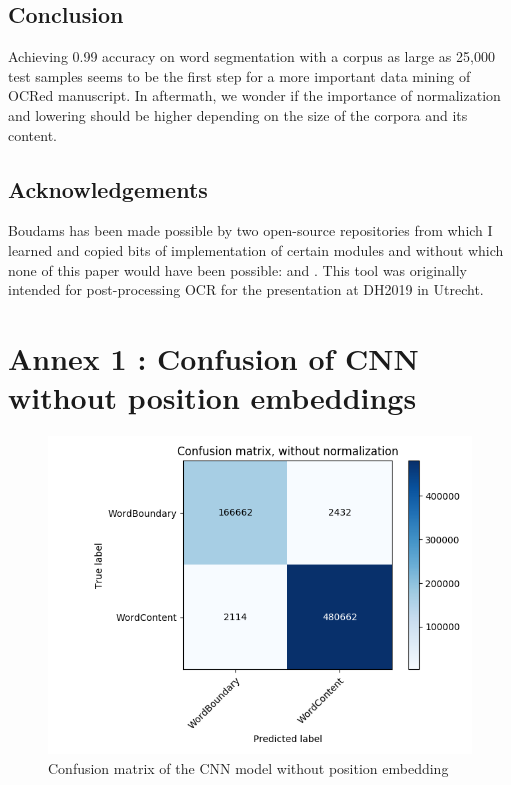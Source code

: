 \documentclass{jdmdh}
\begin{document}
\subsection{Conclusion}

Achieving 0.99 accuracy on word segmentation with a corpus as large as 25,000 test samples seems to be the first step for a more important data mining of OCRed manuscript. In aftermath, we wonder if the importance of normalization and lowering should be higher depending on the size of the corpora and its content.

\subsection{Acknowledgements}

Boudams has been made possible by two open-source repositories from which I learned and copied bits of implementation of certain modules and without which none of this paper would have been possible: \citet{enrique_manjavacas_2019_2654987} and \citet{bentrevett}. This tool was originally intended for post-processing OCR for the presentation \citet{pinchecampsclerice} at DH2019 in Utrecht.






\appendix\footnotesize

\section{Annex 1 : Confusion of CNN without position embeddings}

\begin{figure}[H]
  \centering
  \includegraphics[width=\linewidth]{confusion.png}
  \caption{Confusion matrix of the CNN model without position embedding}
  \label{fig:confusion_matrix}
\end{figure}
\end{document}
